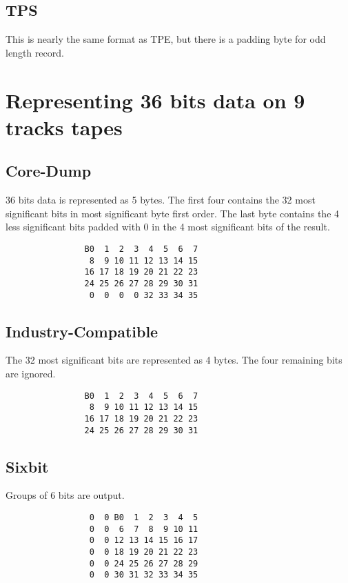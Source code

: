 \documentclass[a4paper,12pt]{article}
\begin{document}
\subsection{TPS}

This is nearly the same format as TPE, but there is a padding byte for odd
length record.

\section{Representing 36 bits data on 9 tracks tapes}

\subsection{Core-Dump}

36 bits data is represented as 5 bytes.  The first four contains the 32
most significant bits in most significant byte first order.  The last byte
contains the 4 less significant bits padded with 0 in the 4 most
significant bits of the result.

\begin{verbatim}
                B0  1  2  3  4  5  6  7
                 8  9 10 11 12 13 14 15
                16 17 18 19 20 21 22 23
                24 25 26 27 28 29 30 31
                 0  0  0  0 32 33 34 35
\end{verbatim}

\subsection{Industry-Compatible}

The 32 most significant bits are represented as 4 bytes.  The four
remaining bits are ignored.

\begin{verbatim}
                B0  1  2  3  4  5  6  7
                 8  9 10 11 12 13 14 15
                16 17 18 19 20 21 22 23
                24 25 26 27 28 29 30 31
\end{verbatim}

\subsection{Sixbit}

Groups of 6 bits are output.

\begin{verbatim}
                 0  0 B0  1  2  3  4  5
                 0  0  6  7  8  9 10 11
                 0  0 12 13 14 15 16 17
                 0  0 18 19 20 21 22 23
                 0  0 24 25 26 27 28 29
                 0  0 30 31 32 33 34 35
\end{verbatim}
\end{document}
